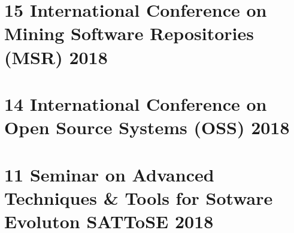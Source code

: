 \documentclass[a4paper, 12pt]{book}
\begin{document}
\newpage
\section{15 International Conference on Mining Software Repositories (MSR) 2018}
\label{MSR}



\section{14 International Conference on Open Source Systems (OSS) 2018}
\label{OSS}



\section{11 Seminar on Advanced Techniques \& Tools for Sotware Evoluton SATToSE 2018}
\label{SATToSE}

\end{document}
